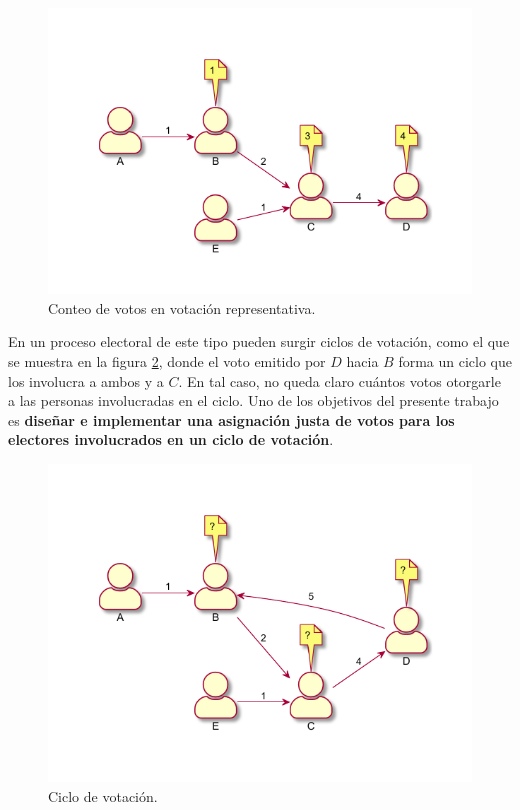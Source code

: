 \begin{figure}[h]
    \centering
    \includegraphics{Graphics/rep-voting.pdf}
    \caption{Conteo de votos en votación representativa.}
    \label{fig:r-voting}
\end{figure}

En un proceso electoral de este tipo pueden surgir ciclos de votación, como el que se muestra en la figura \ref{fig:voting-cycle}, donde el voto emitido por $D$ hacia $B$ forma un ciclo que los involucra a ambos y a $C$. En tal caso, no queda claro cu\'antos votos otorgarle a las personas involucradas en el ciclo.  Uno de los objetivos del presente trabajo es \textbf{dise\~nar e implementar una asignaci\'on justa de  votos para los electores involucrados en un ciclo de votación}. 

\begin{figure}[h]
    \centering
    \includegraphics{Graphics/voting-cycle.pdf}
    \caption{Ciclo de votaci\'on.}
    \label{fig:voting-cycle}
\end{figure}

